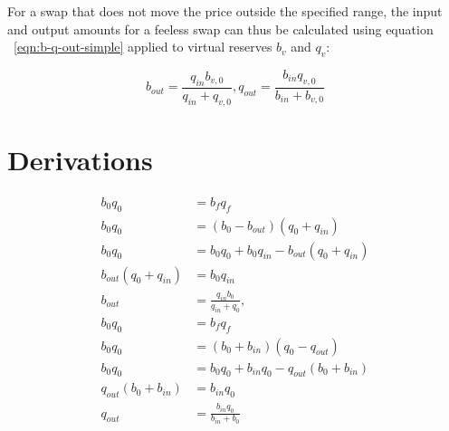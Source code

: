 \documentclass[table, twocolumn]{article}
\begin{document}
For a swap that does not move the price outside the specified range, the input and output amounts
for a feeless swap can thus be calculated using equation ~\ref{eqn:b-q-out-simple} applied to
virtual reserves $b_v$ and $q_v$:

\begin{equation}
  b_{out} = \frac{q_{in} b_{v, 0}}{q_{in} + q_{v, 0}},
  q_{out} = \frac{b_{in} q_{v, 0}}{b_{in} + b_{v, 0}}
\end{equation}

\appendix

\section{Derivations}

\begin{align} \label{eqn:b-q-out-simple-derivation}
  b_0 q_0               & = b_f q_f \nonumber                                      \\
  b_0 q_0               & = (b_0 - b_{out})(q_0 + q_{in}) \nonumber                \\
  b_0 q_0               & = b_0 q_0 + b_0 q_{in} - b_{out}(q_0 + q_{in}) \nonumber \\
  b_{out}(q_0 + q_{in}) & = b_{0} q_{in} \nonumber                                 \\
  b_{out}               & = \frac{q_{in} b_0}{q_{in} + q_0}, \nonumber             \\
  b_0 q_0               & = b_f q_f \nonumber                                      \\
  b_0 q_0               & = (b_0 + b_{in})(q_0 - q_{out}) \nonumber                \\
  b_0 q_0               & = b_0 q_0 + b_{in} q_0 - q_{out}(b_0 + b_{in}) \nonumber \\
  q_{out}(b_0 + b_{in}) & = b_{in} q_0 \nonumber                                   \\
  q_{out}               & = \frac{b_{in} q_0}{b_{in} + b_0}
\end{align}
\end{document}
